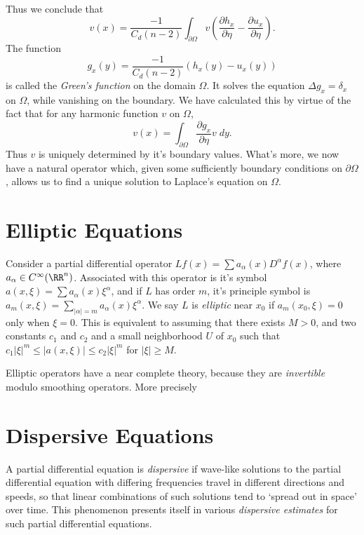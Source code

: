 %
Thus we conclude that
%
\[ v(x) = \frac{-1}{C_d (n-2)} \int_{\partial \Omega} v \left( \frac{\partial h_x}{\partial \eta} - \frac{\partial u_x}{\partial \eta} \right). \]
%
The function
%
\[ g_x(y) = \frac{-1}{C_d (n-2)} (h_x(y) - u_x(y)) \]
%
is called the \emph{Green's function} on the domain $\Omega$. It solves the equation $\Delta g_x = \delta_x$ on $\Omega$, while vanishing on the boundary. We have calculated this by virtue of the fact that for any harmonic function $v$ on $\Omega$,
%
\[ v(x) = \int_{\partial \Omega} \frac{\partial g_x}{\partial \eta} v\; dy. \]
%
Thus $v$ is uniquely determined by it's boundary values. What's more, we now have a natural operator which, given some sufficiently boundary conditions on $\partial \Omega$, allows us to find a unique solution to Laplace's equation on $\Omega$.




\chapter{Elliptic Equations}

Consider a partial differential operator $L f(x) = \sum a_\alpha(x) D^\alpha f(x)$, where $a_\alpha \in C^\infty(\RR^n)$. Associated with this operator is it's symbol $a(x,\xi) = \sum a_\alpha(x) \xi^\alpha$, and if $L$ has order $m$, it's principle symbol is $a_m(x,\xi) = \sum_{|\alpha| = m} a_\alpha(x) \xi^\alpha$. We say $L$ is \emph{elliptic} near $x_0$ if $a_m(x_0,\xi) = 0$ only when $\xi = 0$. This is equivalent to assuming that there exists $M > 0$, and two constants $c_1$ and $c_2$ and a small neighborhood $U$ of $x_0$ such that $c_1 |\xi|^m \leq |a(x,\xi)| \leq c_2 |\xi|^m$ for $|\xi| \geq M$.

Elliptic operators have a near complete theory, because they are \emph{invertible} modulo smoothing operators. More precisely

















\chapter{Dispersive Equations}

A partial differential equation is \emph{dispersive} if wave-like solutions to the partial differential equation with differing frequencies travel in different directions and speeds, so that linear combinations of such solutions tend to `spread out in space' over time. This phenomenon presents itself in various \emph{dispersive estimates} for such partial differential equations.

